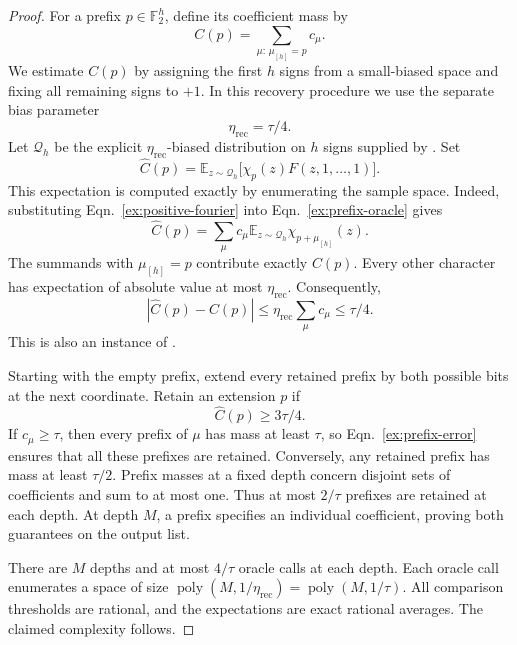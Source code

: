 \documentclass[letterpaper,11pt]{article}
\theoremstyle{definition}
\newcommand{\F}{\mathbb F}
\newcommand{\E}{\mathbb E}
\newcommand{\abs}[1]{\left|#1\right|}
\DeclareMathOperator{\poly}{poly}
\begin{document}
\begin{proof}
For a prefix $p\in\F_2^h$, define its coefficient mass by
\[
  C(p)=\sum_{\mu:\,\mu_{[h]}=p}c_\mu.
\]
We estimate $C(p)$ by assigning the first $h$ signs from a small-biased
space and fixing all remaining signs to $+1$.  In this recovery procedure
we use the separate bias parameter
\begin{equation}
  \eta_{\mathrm{rec}}=\tau/4.
  \label{ex:recovery-bias}
\end{equation}
Let $\mathcal{Q}_h$ be the explicit $\eta_{\mathrm{rec}}$-biased
distribution on $h$ signs supplied by .  Set
\begin{equation}
  \widehat C(p)=
  \E_{z\sim\mathcal{Q}_h}
    \bigl[\chi_p(z)F(z,1,\ldots,1)\bigr].
  \label{ex:prefix-oracle}
\end{equation}
This expectation is computed exactly by enumerating the sample space.
Indeed, substituting Eqn.~\eqref{ex:positive-fourier} into
Eqn.~\eqref{ex:prefix-oracle} gives
\[
  \widehat C(p)=
  \sum_\mu c_\mu
    \E_{z\sim\mathcal{Q}_h}\chi_{p+\mu_{[h]}}(z).
\]
The summands with $\mu_{[h]}=p$ contribute exactly $C(p)$.
Every other character has expectation of absolute value at most
$\eta_{\mathrm{rec}}$.  Consequently,
\begin{equation}
  \abs{\widehat C(p)-C(p)}
    \leq\eta_{\mathrm{rec}}\sum_\mu c_\mu
    \leq\tau/4.
  \label{ex:prefix-error}
\end{equation}
This is also an instance of .

Starting with the empty prefix, extend every retained prefix by both
possible bits at the next coordinate.  Retain an extension $p$ if
\begin{equation}
  \widehat C(p)\geq3\tau/4.
  \label{ex:prefix-test}
\end{equation}
If $c_\mu\geq\tau$, then every prefix of $\mu$ has mass at least
$\tau$, so Eqn.~\eqref{ex:prefix-error} ensures that all these prefixes
are retained.  Conversely, any retained prefix has mass at least
$\tau/2$.  Prefix masses at a fixed depth concern disjoint sets of
coefficients and sum to at most one.  Thus at most $2/\tau$ prefixes
are retained at each depth.  At depth $M$, a prefix specifies an
individual coefficient, proving both guarantees on the output list.

There are $M$ depths and at most $4/\tau$ oracle calls at each depth.
Each oracle call enumerates a space of size
$\poly(M,1/\eta_{\mathrm{rec}})=\poly(M,1/\tau)$.
All comparison thresholds are rational, and the expectations are exact
rational averages.  The claimed complexity follows.
\end{proof}
\end{document}
